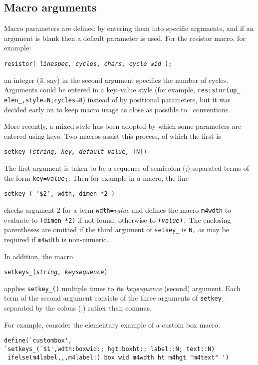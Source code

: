 \subsection{Macro arguments\label{Marcroarguments:}}
Macro parameters are defined
by entering them into specific arguments, and if an argument is blank then
a default parameter is used.
For the resistor macro, for example:

{\tt resistor( {\sl linespec, cycles, chars, cycle wid} );}

\noindent
an integer (3, say) in the second argument specifies the number of cycles.
Arguments could be entered in a key--value style (for example,
{\tt resistor(up\_ elen\_,style=N;cycles=8}) instead of by positional
parameters, but it was decided early on
to keep macro usage as close as possible to \pic\ conventions.

More recently, a mixed style has been adopted by which some
parameters are entered using keys.  Two macros assist this process,
of which the first is

{\tt setkey\_({\sl string, key, default value, }[N])}

The first argument
is taken to be a sequence of semicolon (;)-separated terms of the form
{\tt key={\sl value};}.
Then for example in a macro, the line

{\tt setkey\_( `\$2', wdth, dimen\_*2 )}

\noindent
checks argument 2 for a term {\tt wdth=}{\sl value} and defines
the macro {\tt m4wdth} to evaluate to
{\tt (dimen\_*2)} if not found,
otherwise to {\tt ({\sl value}).}
The enclosing parentheses are omitted if the
third argument of {\tt setkey\_} is {\tt N,} as may be required if {\tt m4wdth}
is non-numeric.

In addition, the macro

{\tt setkeys\_({\sl string, keysequence})}

\noindent
applies {\tt setkey\_()} multiple times to its {\sl keysequence}
(second) argument.
Each term of the second argument consists of the three
arguments of {\tt setkey\_} separated by the colons (:) rather than commas.

For example, consider the elementary example of a custom box macro:

\begin{verbatim}
define(`custombox',
`setkeys_(`$1',wdth:boxwid:; hgt:boxht:; label::N; text::N)
 ifelse(m4label,,,m4label:) box wid m4wdth ht m4hgt "m4text" ')
\end{verbatim}


